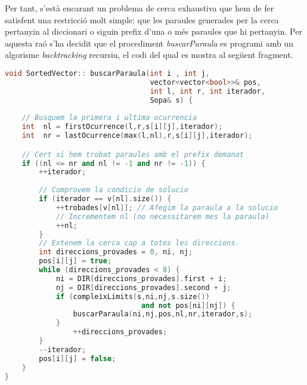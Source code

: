 \documentclass[titlepage]{article}
\begin{document}
Per tant, s'està encarant un problema de cerca exhaustiva que hem de fer satisfent una restricció molt simple: que les paraules generades per la cerca pertanyin al diccionari o siguin prefix d'una o més paraules que hi pertanyin. Per aquesta raó s'ha decidit que el procediment \textit{buscarParaula} es programi amb un algorisme \textit{backtracking} recursiu, el codi del qual  es mostra al següent fragment.\newline

\begin{lstlisting}[language=C++]
void SortedVector:: buscarParaula(int i , int j, 
                                  vector<vector<bool>>& pos,
                                  int l, int r, int iterador,
                                  Sopa& s) {
    
    // Busquem la primera i ultima ocurrencia
    int  nl = firstOcurrence(l,r,s[i][j],iterador);
    int  nr = lastOcurrence(max(l,nl),r,s[i][j],iterador);

    // Cert si hem trobat paraules amb el prefix demanat
    if ((nl <= nr and nl != -1 and nr != -1)) {
        ++iterador;
        
        // Comprovem la condicio de solucio
        if (iterador == v[nl].size()) { 
            ++trobades[v[nl]]; // Afegim la paraula a la solucio
            // Incrementem nl (no necessitarem mes la paraula)
            ++nl; 
        }
        // Extenem la cerca cap a totes les direccions.
        int direccions_provades = 0, ni, nj;
        pos[i][j] = true;
        while (direccions_provades < 8) {
            ni = DIR[direccions_provades].first + i;
            nj = DIR[direccions_provades].second + j; 
            if (compleixLimits(s,ni,nj,s.size()) 
                                and not pos[ni][nj]) {
                buscarParaula(ni,nj,pos,nl,nr,iterador,s);
            }
                ++direccions_provades;
        }
        --iterador;
        pos[i][j] = false;
    }
}    
\end{lstlisting}
\end{document}
